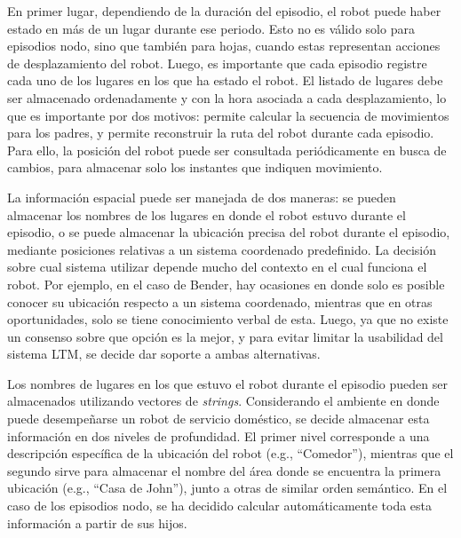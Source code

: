 En primer lugar, dependiendo de la duración del episodio, el robot puede haber estado en más de un lugar durante ese periodo. Esto no es válido solo para episodios nodo, sino que también para hojas, cuando estas representan acciones de desplazamiento del robot. Luego, es importante que cada episodio registre cada uno de los lugares en los que ha estado el robot. El listado de lugares debe ser almacenado ordenadamente y con la hora asociada a cada desplazamiento, lo que es importante por dos motivos: permite calcular la secuencia de movimientos para los padres, y permite reconstruir la ruta del robot durante cada episodio. Para ello, la posición del robot puede ser consultada periódicamente en busca de cambios, para almacenar solo los instantes que indiquen movimiento. 

La información espacial puede ser manejada de dos maneras: se pueden almacenar los nombres de los lugares en donde el robot estuvo durante el episodio, o se puede almacenar la ubicación precisa del robot durante el episodio, mediante posiciones relativas a un sistema coordenado predefinido. La decisión sobre cual sistema utilizar depende mucho del contexto en el cual funciona el robot. Por ejemplo, en el caso de Bender, hay ocasiones en donde solo es posible conocer su ubicación respecto a un sistema coordenado, mientras que en otras oportunidades, solo se tiene conocimiento verbal de esta. Luego, ya que no existe un consenso sobre que opción es la mejor, y para evitar limitar la usabilidad del sistema LTM, se decide dar soporte a ambas alternativas.


Los nombres de lugares en los que estuvo el robot durante el episodio pueden ser almacenados utilizando vectores de \textit{strings}. Considerando el ambiente en donde puede desempeñarse un robot de servicio doméstico, se decide almacenar esta información en dos niveles de profundidad. El primer nivel corresponde a una descripción específica de la ubicación del robot (e.g., ``Comedor''), mientras que el segundo sirve para almacenar el nombre del área donde se encuentra la primera ubicación (e.g., ``Casa de John''), junto a otras de similar orden semántico. En el caso de los episodios nodo, se ha decidido calcular automáticamente toda esta información a partir de sus hijos.

